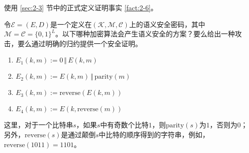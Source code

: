 \begin{exercise}\label{exer:2-9}
使用 \ref{sec:2-3} 节中的正式定义证明事实 \ref{fact:2-6}。
\end{exercise}

\begin{exercise}[练习语义安全性的定义]\label{exer:2-10}
令$\mathcal{E}=(E,D)$是一个定义在$(\mathcal{K},\mathcal{M},\mathcal{C})$上的语义安全密码，其中$\mathcal{M}=\mathcal{C}=\{0,1\}^L$。以下哪种加密算法会产生语义安全的方案？要么给出一种攻击，要么通过明确的归约提供一个安全证明。
\begin{enumerate}[\indent(a)]
	\item $E_1(k,m):=0\,\Vert\,E(k,m)$
	\item $E_2(k,m):=E(k,m)\,\Vert\,\mathrm{parity}(m)$
	\item $E_3(k,m):=\mathrm{reverse}(E(k,m))$
	\item $E_4(k,m):=E(k,\mathrm{reverse}(m))$
\end{enumerate}
这里，对于一个比特串$s$，如果$s$中有奇数个比特$1$，则$\mathrm{parity}(s)$为$1$，否则为$0$；另外，$\mathrm{reverse}(s)$是通过颠倒$s$中比特的顺序得到的字符串，例如，$\mathrm{reverse}(1011)=1101$。
\end{exercise}

